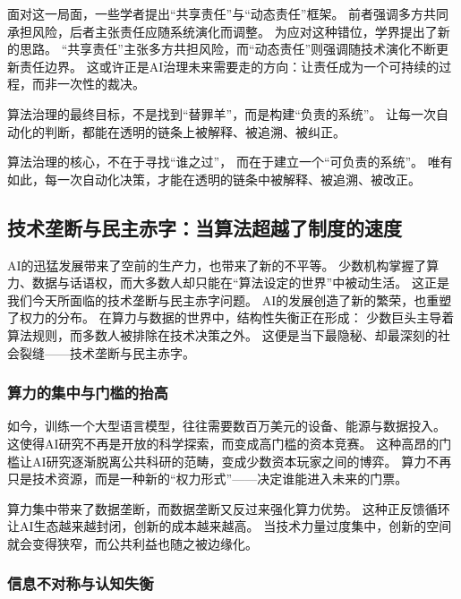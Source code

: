面对这一局面，一些学者提出“共享责任”与“动态责任”框架。  
前者强调多方共同承担风险，后者主张责任应随系统演化而调整。  
为应对这种错位，学界提出了新的思路。  
“共享责任”主张多方共担风险，而“动态责任”则强调随技术演化不断更新责任边界。  
这或许正是AI治理未来需要走的方向：让责任成为一个可持续的过程，而非一次性的裁决。

\begin{center}
算法治理的最终目标，不是找到“替罪羊”，而是构建“负责的系统”。  
让每一次自动化的判断，都能在透明的链条上被解释、被追溯、被纠正。  
\end{center}
\begin{center}
算法治理的核心，不在于寻找“谁之过”，  
而在于建立一个“可负责的系统”。  
唯有如此，每一次自动化决策，才能在透明的链条中被解释、被追溯、被改正。  
\end{center}

\subsection{技术垄断与民主赤字：当算法超越了制度的速度}

AI的迅猛发展带来了空前的生产力，也带来了新的不平等。  
少数机构掌握了算力、数据与话语权，而大多数人却只能在“算法设定的世界”中被动生活。  
这正是我们今天所面临的技术垄断与民主赤字问题。  
AI的发展创造了新的繁荣，也重塑了权力的分布。  
在算力与数据的世界中，结构性失衡正在形成：  
少数巨头主导着算法规则，而多数人被排除在技术决策之外。  
这便是当下最隐秘、却最深刻的社会裂缝——技术垄断与民主赤字。

\subsubsection{算力的集中与门槛的抬高}

如今，训练一个大型语言模型，往往需要数百万美元的设备、能源与数据投入。  
这使得AI研究不再是开放的科学探索，而变成高门槛的资本竞赛。  
这种高昂的门槛让AI研究逐渐脱离公共科研的范畴，变成少数资本玩家之间的博弈。  
算力不再只是技术资源，而是一种新的“权力形式”——决定谁能进入未来的门票。

算力集中带来了数据垄断，而数据垄断又反过来强化算力优势。  
这种正反馈循环让AI生态越来越封闭，创新的成本越来越高。  
当技术力量过度集中，创新的空间就会变得狭窄，而公共利益也随之被边缘化。

\subsubsection{信息不对称与认知失衡}

